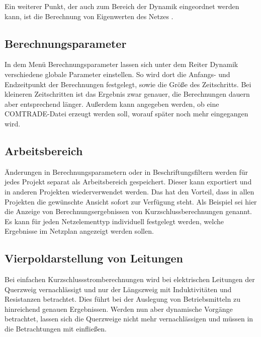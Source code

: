 \documentclass{scrartcl}
\begin{document}
\begin{onehalfspace}
Ein weiterer Punkt, der auch zum Bereich der Dynamik eingeordnet werden kann, ist die Berechnung von Eigenwerten des Netzes \cite[S. 389]{Heuck2007}.

\subsection{Berechnungsparameter}
In dem Menü \glqq Berechnungsparameter\grqq{} lassen sich unter dem Reiter \glqq Dynamik\grqq{} verschiedene globale Parameter einstellen. So wird dort die Anfangs- und Endzeitpunkt der Berechnungen festgelegt, sowie die Größe des Zeitschritts. Bei kleineren Zeitschritten ist das Ergebnis zwar genauer, die Berechnungen dauern aber entsprechend länger. Außerdem kann angegeben werden, ob eine COMTRADE-Datei erzeugt werden soll, worauf später noch mehr eingegangen wird.

\subsection{Arbeitsbereich}
Änderungen in Berechnungsparametern oder in Beschriftungsfiltern werden für jedes Projekt separat als \glqq Arbeitsbereich\grqq{} gespeichert. Dieser kann exportiert und in anderen Projekten wiederverwendet werden. Das hat den Vorteil, dass in allen Projekten die gewünschte Ansicht sofort zur Verfügung steht. Als Beispiel sei hier die Anzeige von Berechnungsergebnissen von Kurzschlussberechnungen genannt. Es kann für jeden Netzelementtyp individuell festgelegt werden, welche Ergebnisse im Netzplan angezeigt werden sollen.

\subsection{Vierpoldarstellung von Leitungen}
Bei einfachen Kurzschlussstromberechnungen wird bei elektrischen Leitungen der Querzweig vernachlässigt und nur der Längszweig mit Induktivitäten und Resistanzen betrachtet. Dies führt bei der Auslegung von Betriebsmitteln zu hinreichend genauen Ergebnissen. Werden nun aber dynamische Vorgänge betrachtet, lassen sich die Querzweige nicht mehr vernachlässigen und müssen in die Betrachtungen mit einfließen.



\end{onehalfspace}
\end{document}
